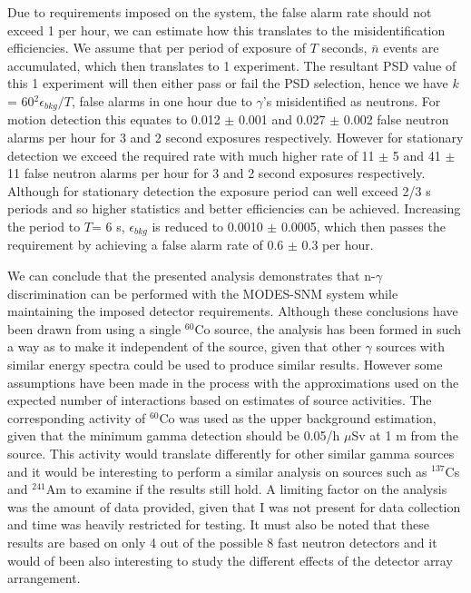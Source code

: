Due to requirements imposed on the system, the false alarm rate should not exceed 1 per hour, we can estimate how this translates to the misidentification efficiencies. We assume that per period of exposure of $T$ seconds, $\bar{n}$ events are accumulated, which then translates to 1 experiment. The resultant PSD value of this 1 experiment will then either pass or fail the PSD selection, hence we have $k$ = 60$^{2}\epsilon_{bkg}/T$, false alarms in one hour due to $\gamma$'s misidentified as neutrons. For motion detection this equates to 0.012 $\pm$ 0.001 and 0.027 $\pm$ 0.002 false neutron alarms per hour for 3 and 2 second exposures respectively. However for stationary detection we exceed the required rate with much higher rate of 11 $\pm$ 5 and 41 $\pm$ 11 false neutron alarms per hour for 3 and 2 second exposures respectively. Although for stationary detection the exposure period can well exceed 2/3 s periods and so higher statistics and better efficiencies can be achieved. Increasing the period to $T$= 6 s, $\epsilon_{bkg}$ is reduced to 0.0010 $\pm$ 0.0005, which then passes the requirement by achieving a false alarm rate of 0.6 $\pm$ 0.3 per hour.

We can conclude that the presented analysis demonstrates that n-$\gamma$ discrimination can be performed with the MODES-SNM system while maintaining the imposed detector requirements. Although these conclusions have been drawn from using a single $^{60}$Co source, the analysis has been formed in such a way as to make it independent of the source, given that other $\gamma$ sources with similar energy spectra could be used to produce similar results. However some assumptions have been made in the process with the approximations used on the expected number of interactions based on estimates of source activities. The corresponding activity of $^{60}$Co was used as the upper background estimation, given that the minimum gamma detection should be 0.05/h $\mu$Sv at 1 m from the source. This activity would translate differently for other similar gamma sources and it would be interesting to perform a similar analysis on sources such as $^{137}$Cs and $^{241}$Am to examine if the results still hold. A limiting factor on the analysis was the amount of data provided, given that I was not present for data collection and time was heavily restricted for testing. It must also be noted that these results are based on only 4 out of the possible 8 fast neutron detectors and it would of been also interesting to study the different effects of the detector array arrangement. 


